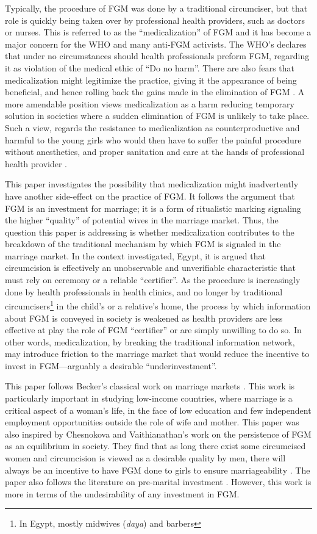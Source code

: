 \documentclass[12pt]{article}
\begin{document}
Typically, the procedure of FGM was done by a traditional circumciser, but that role is quickly being taken over by professional health providers, such as doctors or nurses.  This is referred to as the ``medicalization'' of FGM and it has become a major concern for the WHO and many anti-FGM activists. The WHO's declares that under no circumstances should health professionals preform FGM, regarding it as violation of the medical ethic of ``Do no harm''. There are also fears that medicalization might legitimize the practice, giving it the appearance of being beneficial, and hence rolling back the gains made in the elimination of FGM \cite{OHCHR}. A more amendable position views medicalization as a harm reducing temporary solution in societies where a sudden elimination of FGM is unlikely to take place.  Such a view, regards the resistance to medicalization as counterproductive and harmful to the young girls who would then have to suffer the painful procedure without anesthetics, and proper sanitation and care at the hands of professional health provider \cite{Shell-Duncan2001}. 

This paper investigates the possibility that medicalization might inadvertently have another side-effect on the practice of FGM.  It follows the argument that FGM is an investment for marriage; it is a form of ritualistic marking signaling the higher ``quality'' of potential wives in the marriage market. Thus, the question this paper is addressing is whether medicalization contributes to the breakdown of the traditional mechanism by which FGM is signaled in the marriage market.  In the context investigated, Egypt, it is argued that circumcision is effectively an unobservable and unverifiable characteristic that must rely on ceremony or a reliable ``certifier''.  As the procedure is increasingly done by health professionals in health clinics, and no longer by traditional circumcisers\footnote{In Egypt, mostly midwives (\emph{daya}) and barbers} in the child's or a relative's home, the process by which information about FGM is conveyed in society is weakened as health providers are less effective at play the role of FGM ``certifier'' or are simply unwilling to do so. In other words, medicalization, by breaking the traditional information network, may introduce friction to the marriage market that would reduce the incentive to invest in FGM---arguably a desirable ``underinvestment''.

This paper follows Becker's classical work on marriage markets \cite{Becker1981}.  This work is particularly important in studying low-income countries, where marriage is a critical aspect of a woman's life, in the face of low education and few independent employment opportunities outside the role of wife and mother. This paper was also inspired by Chesnokova and Vaithianathan's work on the persistence of FGM as an equilibrium in society. They find that as long there exist some circumcised women and circumcision is viewed as a desirable quality by men, there will always be an incentive to have FGM done to girls to ensure marriageability \cite{Chesnokova2007}. The paper also follows the literature on pre-marital investment \cite{Burdett2001, Peters2002}.  However, this work is more in terms of the undesirability of any investment in FGM.  
\end{document}
